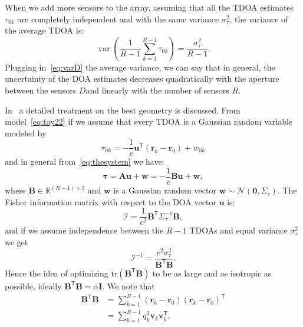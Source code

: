 \noindent
When we add more sensors to the array, assuming that all the TDOA estimates \(\tau_{0k}\) are completely independent and with the same variance \(\sigma_\tau^2\), the variance of the average TDOA is:
\begin{equation}
\operatorname{var}\left(\frac{1}{R-1} \sum_{k=1}^{R-1}  \tau_{0k}\right)=\frac{\sigma_\tau^2}{R-1} .
\label{eq:varR}
\end{equation}
Plugging in~\eqref{eq:varD} the average variance, we can say that in general, the uncertainty of the DOA estimates decreases quadratically with the aperture between the sensors \(D\)and linearly with the number of sensors \(R\). 

\noindent
In~\cite{yang2005cramer} a detailed treatment on the best geometry is discussed. From model~\eqref{eq:tay22} if we assume that every TDOA is a Gaussian random variable modeled by
\begin{equation}
\tau_{0k}=-\frac{1}{c} \mathbf{u}^{\mathsf{T}}\left(\mathbf{r}_k-\mathbf{r}_0\right)+w_{0k}
\end{equation}
and in general from~\eqref{eq:thesystem} we have:
\begin{equation}
\boldsymbol{\tau}= \mathbf{Au}+\mathbf{w}=-\frac{1}{c} \mathbf{B} \mathbf{u}+\mathbf{w},
\end{equation}
where \(\mathbf{B}\in\mathbb{R}^{(R-1)\times3}\) and \(\mathbf{w}\) is a Gaussian random vector \( \mathbf{w} \sim \mathcal{N}\left(\mathbf{0}, \Sigma_\tau\right)\). The Fisher information matrix with respect to the DOA vector \(\mathbf{u}\) is:
\begin{equation}
\boldsymbol{\mathcal{I}}=\frac{1}{c^2}\mathbf{B}^{\mathsf{T}}\Sigma_\tau^{-1}\mathbf{B},
\end{equation}
and if we assume independence between the \(R-1\) TDOAs and equal variance \(\sigma_\tau^2\) we get 
\begin{equation}
\boldsymbol{\mathcal{I}}^{-1}=\frac{c^2\sigma_{\tau}^2}{\mathbf{B}^{\mathsf{T}}\mathbf{B}}.
\end{equation}
Hence the idea of optimizing \(\text{tr}\left(\mathbf{B}^{\mathsf{T}}\mathbf{B}\right)\) to be as large and as isotropic as possible, ideally \(\mathbf{B}^{\mathsf{T}}\mathbf{B}=\alpha \mathbf{I}\). We note that 
\begin{equation}
\begin{aligned}
\mathbf{B}^{\mathsf{T}} \mathbf{B}
& =\sum_{k = 1}^{R-1}\left(\mathbf{r}_k-\mathbf{r}_0\right)\left(\mathbf{r}_k-\mathbf{r}_0\right)^{\mathsf{T}}\\
& = \sum_{k = 1}^{R-1} q_k^2 {\mathbf{v}}_k {\mathbf{v}}_k^{\mathsf{T}},
\end{aligned}
\end{equation}

